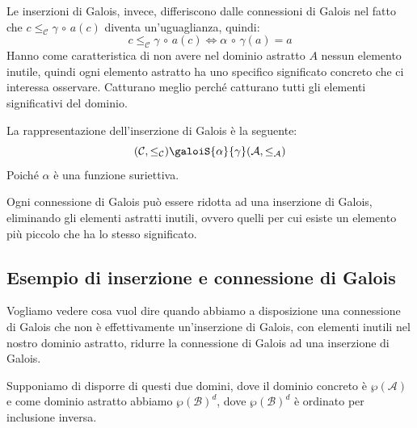 Le inserzioni di Galois, invece, differiscono dalle connessioni di Galois nel fatto che 
$c \leq_\mathcal{C} \gamma \, \circ \, a(c)$ diventa un'uguaglianza, quindi:
\[c \leq_\mathcal{C} \gamma \, \circ \, a(c) \iff \alpha \, \circ \, \gamma(a) = a\]
Hanno come caratteristica di non avere nel dominio astratto $A$ nessun elemento inutile, 
quindi ogni elemento astratto ha uno specifico significato concreto che ci interessa 
osservare. Catturano meglio perché catturano tutti gli elementi significativi del dominio.

La rappresentazione dell'inserzione di Galois è la seguente:
\[(\mathcal{C}, \leq_\mathcal{C}) \galoiS{\alpha}{\gamma} (\mathcal{A}, \leq_\mathcal{A})\]
Poiché $\alpha$ è una funzione suriettiva.

Ogni connessione di Galois può essere ridotta ad una inserzione di Galois, eliminando 
gli elementi astratti inutili, ovvero quelli per cui esiste un elemento più piccolo che 
ha lo stesso significato.
\subsection{Esempio di inserzione e connessione di Galois}
Vogliamo vedere cosa vuol dire quando abbiamo a disposizione una connessione di Galois 
che non è effettivamente un'inserzione di Galois, con elementi inutili nel nostro 
dominio astratto, ridurre la connessione di Galois ad una inserzione di Galois.

Supponiamo di disporre di questi due domini, dove il dominio concreto è 
$\wp(\mathcal{A})$ e come dominio astratto abbiamo $\wp(\mathcal{B})^d$, dove 
$\wp(\mathcal{B})^d$ è ordinato per inclusione inversa.

